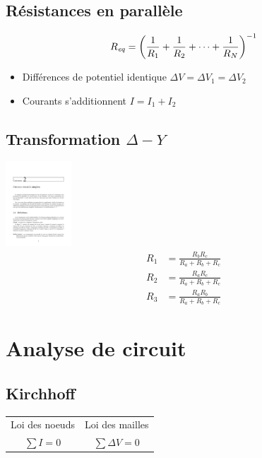 \subsection{Résistances en parallèle}
\begin{equation*}
    R_{\mathit{eq}}=\qty(\frac{1}{R_1}+\frac{1}{R_2}+\dots +\frac{1}{R_N})^{-1}
\end{equation*}
\begin{itemize}[nosep]
    \item Différences de potentiel identique \( \Delta V = \Delta V_1 =\Delta V_2 \)
    \item Courants s'additionnent \( I = I_1 + I_2\)
\end{itemize}

\subsection{Transformation $\Delta-Y$}
\centering
\includegraphics[trim={2in 7.5in 2in 1.25in}, clip=true,page=15,height=1.25in]{fig/note2.pdf}
\begin{align*}
    R_1 &= \frac{R_b R_c}{R_a + R_b + R_c}\\
    R_2 &= \frac{R_a R_c}{R_a + R_b + R_c}\\
    R_3 &= \frac{R_a R_b}{R_a + R_b + R_c}
\end{align*}
\raggedright

\section{Analyse de circuit}

\subsection{Kirchhoff}
\centering
\begin{tabular}{c|c}
    Loi des noeuds & Loi des mailles \\
    \(\sum I = 0\) & \(\sum \Delta V =0\)
\end{tabular}


